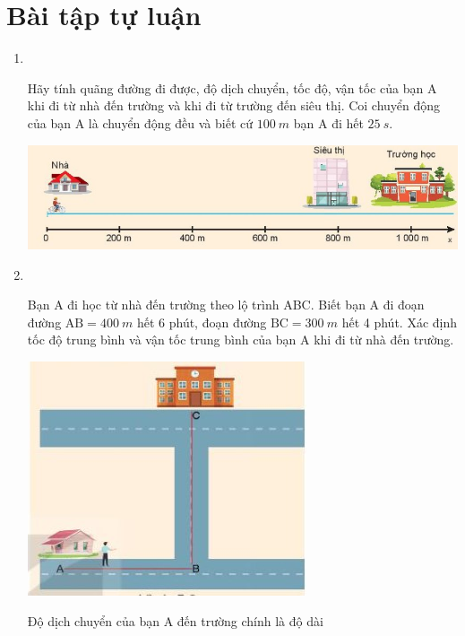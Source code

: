 \section{Bài tập tự luận}
\begin{enumerate}[label=\bfseries Bài \arabic*:,leftmargin=1.5cm]
		\item {}\\
	{
		Hãy tính quãng đường đi được, độ dịch chuyển, tốc độ, vận tốc của bạn A khi đi từ nhà đến trường và khi đi từ trường đến siêu thị. Coi chuyển động của bạn A là chuyển động đều và biết cứ $\SI{100}{m}$ bạn A đi hết $\SI{25}{s}$.
		\begin{center}
			\includegraphics[scale=0.9]{../figs/VN10-2022-PH-TP006-1.jpg}
		\end{center}
	}
	

	\item {}\\
	{
		Bạn A đi học từ nhà đến trường theo lộ trình ABC. Biết bạn A đi đoạn đường $\text{AB} = \SI{400}{m}$ hết 6 phút, đoạn đường $\text{BC} = \SI{300}{m}$ hết 4 phút. Xác định tốc độ trung bình và vận tốc trung bình của bạn A khi đi từ nhà đến trường.
		\begin{center}
			\includegraphics[scale=1]{../figs/VN10-2022-PH-TP005-2.jpg}
		\end{center}
	}
	\hideall
	{
		Độ dịch chuyển của bạn A đến trường chính là độ dài
		
}
\end{enumerate}
